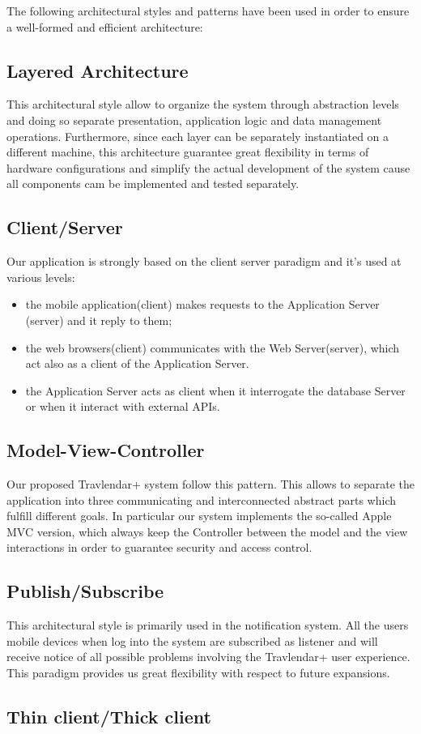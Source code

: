 The following architectural styles and patterns have been used in order to ensure a well-formed and efficient architecture:

\subsection{Layered Architecture}
\label{subsect:Layered Architecture}
This architectural style allow to organize the system through abstraction levels and doing so separate presentation, application logic and data management operations. Furthermore, since each layer can be separately instantiated on a
different machine, this architecture guarantee great flexibility in terms of hardware configurations and simplify the actual development of the system cause all components cam be implemented and tested separately.

\subsection{Client/Server}
\label{subsect:Client/Server}
Our application is strongly based on the client server paradigm and it's used at various levels:
\begin{itemize}
	\item the mobile application(client) makes requests to the Application Server (server) and it reply to them;
	\item the web browsers(client) communicates with the Web Server(server), which act also as a client of the Application Server.
	\item the Application Server acts as client when it interrogate the database Server or when it interact with external APIs.
\end{itemize}

\subsection{Model-View-Controller}
\label{subsect:Model-View-Controller}
Our proposed Travlendar+ system follow this pattern. This allows to separate the application into three communicating and interconnected abstract parts which fulfill different goals. In particular our system implements the so-called Apple MVC version, which always keep the Controller between the model and the view interactions in order to guarantee security and  access control. 

\subsection{Publish/Subscribe}
\label{subsect:Publish/Subscribe}
This architectural style is primarily used in the notification system. All the users mobile devices when log into the system are subscribed as listener and will receive notice of all possible problems involving the Travlendar+ user experience. This paradigm provides us great flexibility with respect to future expansions.

\subsection{Thin client/Thick client}
\label{subsect:Thin client/Thick client}

